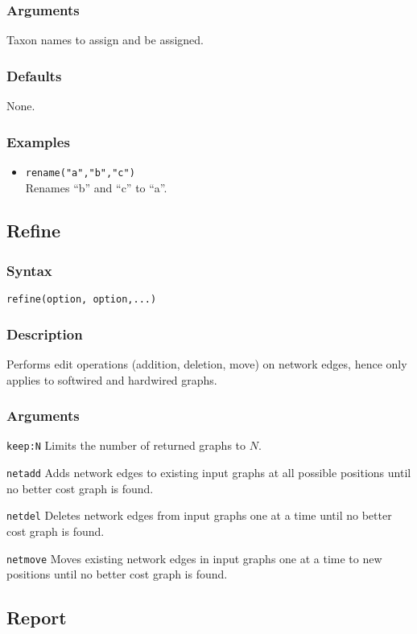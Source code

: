 \documentclass[11pt]{article}
\begin{document}
		\subsubsection{Arguments}
			Taxon names to assign and be assigned.
		\subsubsection{Defaults}
			None.
		\subsubsection{Examples}
			 \begin{itemize}
			 	\item{\texttt{rename("a","b","c")}\\ Renames ``b'' and ``c'' to ``a''. }
			\end{itemize}
		
	\subsection{Refine}
		\subsubsection{Syntax}
		\texttt{refine(option, option,...)}
		\subsubsection{Description}
		Performs edit operations (addition, deletion, move) on network edges, hence only applies to softwired and hardwired graphs.
		\subsubsection{Arguments}
			\noindent \texttt{keep:N} Limits the number of returned graphs to $N$.  
		
			\smallskip		
			\noindent \texttt{netadd} Adds network edges to existing input graphs at all possible positions until no better cost graph is found.
			
			\smallskip
			\noindent \texttt{netdel} Deletes network edges from input graphs one at a time until no better cost graph is found.
			
			\smallskip
			\noindent \texttt{netmove} Moves existing network edges in input graphs one at a time to new positions until no better cost graph is found.
			
	\subsection{Report}
\end{document}
